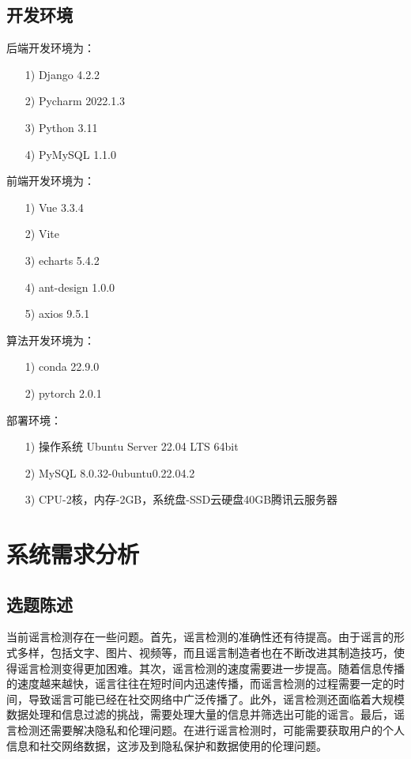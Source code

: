 \documentclass{article}
\begin{document}
\subsection{开发环境}
后端开发环境为：
\begin{itemize}
  \item [1)]
  Django 4.2.2
  \item [2)]
  Pycharm 2022.1.3
  \item [3)]
  Python 3.11
  \item [4)]
  PyMySQL 1.1.0
\end{itemize}

前端开发环境为：
\begin{itemize}
  \item [1)]    Vue 3.3.4
  \item [2)]    Vite
  \item [3)]    echarts 5.4.2
  \item [4)]    ant-design 1.0.0
  \item [5)]    axios 9.5.1
\end{itemize}

算法开发环境为：
\begin{itemize}
  \item [1)]
  conda 22.9.0
  \item [2)]
  pytorch 2.0.1
\end{itemize}

部署环境：
\begin{itemize}
  \item [1)]
  操作系统 Ubuntu Server 22.04 LTS 64bit
  \item [2)]
  MySQL 8.0.32-0ubuntu0.22.04.2
  \item [3)]
  CPU-2核，内存-2GB，系统盘-SSD云硬盘40GB腾讯云服务器
\end{itemize}

\newpage

\section{系统需求分析}
\subsection{选题陈述}
当前谣言检测存在一些问题。首先，谣言检测的准确性还有待提高。由于谣言的形式多样，包括文字、图片、视频等，而且谣言制造者也在不断改进其制造技巧，使得谣言检测变得更加困难。其次，谣言检测的速度需要进一步提高。随着信息传播的速度越来越快，谣言往往在短时间内迅速传播，而谣言检测的过程需要一定的时间，导致谣言可能已经在社交网络中广泛传播了。此外，谣言检测还面临着大规模数据处理和信息过滤的挑战，需要处理大量的信息并筛选出可能的谣言。最后，谣言检测还需要解决隐私和伦理问题。在进行谣言检测时，可能需要获取用户的个人信息和社交网络数据，这涉及到隐私保护和数据使用的伦理问题。
\end{document}
